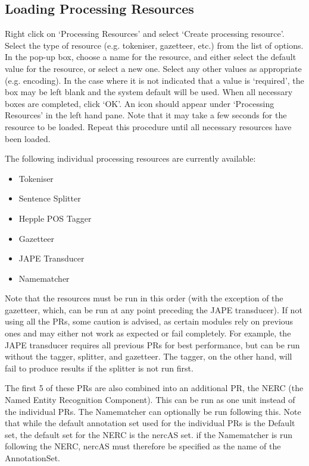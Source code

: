 \subsection{Loading Processing Resources}


Right click on `Processing Resources' and select `Create processing
resource'. Select the type of resource (e.g. tokeniser, gazetteer,
etc.) from the list of options. In the pop-up box, choose a name for
the resource, and either select the default value for the resource, or
select a new one. Select any other values as appropriate
(e.g. encoding). In the case where it is not indicated that a value is
`required', the box may be left blank and the system default will be
used. When all necessary boxes are completed, click `OK'. An icon should appear
under `Processing Resources' in the left hand pane. Note that it may
take a few seconds for the resource to be loaded. Repeat this
procedure until all necessary resources have been loaded.

The following individual processing resources are currently available: 
\begin{itemize}
\item Tokeniser
\item Sentence Splitter
\item Hepple POS Tagger
\item Gazetteer
\item JAPE Transducer
\item Namematcher
\end{itemize}

Note that the resources must be run in this order (with the exception
of the gazetteer, which, can be run at any point preceding the JAPE
transducer). If not using all the PRs, some caution is advised, as
certain modules rely on previous ones and may either not work as
expected or fail completely. For example, the JAPE transducer requires
all previous PRs for best performance, but can be run without the
tagger, splitter, and gazetteer. The tagger, on the other hand, will
fail to produce results if the splitter is not run first. 

The first 5 of these PRs are also combined into an additional
PR, the NERC (the Named Entity Recognition Component). This can be run
as one unit instead of the individual PRs. The Namematcher can
optionally be run following this. Note that while the default
annotation set used for the individual PRs is the Default set, the
default set for the NERC is the nercAS set. if the Namematcher is run
following the NERC, nercAS must therefore be specified as the name of the AnnotationSet.

